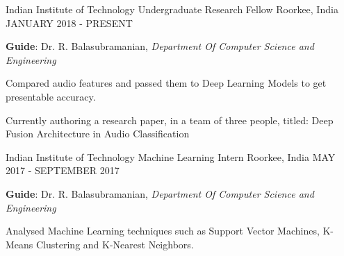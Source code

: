 \begin{cventries}
  \cventry
    {Indian Institute of Technology}
    {Undergraduate Research Fellow}
    {Roorkee, India}
    {JANUARY 2018 - PRESENT}
    {
      \begin{cvitems}
        \item {\textbf{Guide}: Dr. R. Balasubramanian, 
        \textit{Department Of Computer Science and Engineering}}
        \item {Compared audio features and passed them to Deep Learning Models to get presentable accuracy.}
        \item {Currently authoring a research paper, in a team of three people, titled:
        Deep Fusion Architecture in Audio Classification}
      \end{cvitems}
    }
  \cventry
    {Indian Institute of Technology}
    {Machine Learning Intern}
    {Roorkee, India}
    {MAY 2017 - SEPTEMBER 2017}
    {
      \begin{cvitems}
        \item {\textbf{Guide}: Dr. R. Balasubramanian, 
        \textit{Department Of Computer Science and Engineering}}
        \item {Analysed Machine Learning techniques such as Support Vector Machines,
        K-Means Clustering and K-Nearest Neighbors.}
      \end{cvitems}
    }
\end{cventries}
